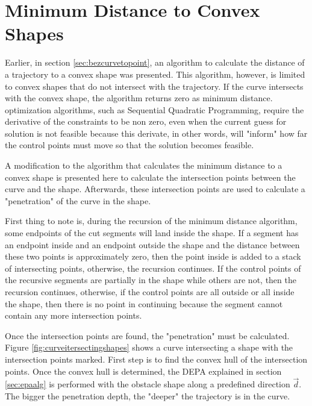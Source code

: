 \section{Minimum Distance to Convex Shapes}
\label{sec:mindistconvshapes}

\par Earlier, in section \ref{sec:bezcurvetopoint}, an algorithm to calculate the distance of a trajectory to a convex shape was presented. This algorithm, however, is limited to convex shapes that do not intersect with the trajectory. If the curve intersects with the convex shape, the algorithm returns zero as minimum distance. optimization algorithms, such as Sequential Quadratic Programming\cite{10.1007/978-0-387-35514-6_7}, require the derivative of the constraints to be non zero, even when the current guess for solution is not feasible because this derivate, in other words, will "inform" how far the control points must move so that the solution becomes feasible.

\par A modification to the algorithm that calculates the minimum distance to a convex shape is presented here to calculate the intersection points between the curve and the shape. Afterwards, these intersection points are used to calculate a "penetration" of the curve in the shape.
\par First thing to note is, during the recursion of the minimum distance algorithm, some endpoints of the cut segments will land inside the shape. If a segment has an endpoint inside and an endpoint outside the shape and the distance between these two points is approximately zero, then the point inside is added to a stack of intersecting points, otherwise, the recursion continues. If the control points of the recursive segments are partially in the shape while others are not, then the recursion continues, otherwise, if the control points are all outside or all inside the shape, then there is no point in continuing because the segment cannot contain any more intersection points.
\par Once the intersection points are found, the "penetration" must be calculated. Figure \ref{fig:curveitersectingshapes} shows a curve intersecting a shape with the intersection points marked. First step is to find the convex hull of the intersection points. Once the convex hull is determined, the \ac{DEPA} explained in section \ref{sec:epaalg}  is performed with the obstacle shape along a predefined direction $\overrightarrow{d}$. The bigger the penetration depth, the "deeper" the trajectory is in the curve.

